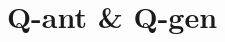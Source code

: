 %
%
%
% 
%
%
\title{ \huge \bfseries Q-ant \& Q-gen}

\documentclass[10pt]{article}
\usepackage[english]{babel}
\usepackage[utf8x]{inputenc}
\usepackage{amsmath}
\usepackage{graphicx}
\usepackage[colorinlistoftodos]{todonotes}
\usepackage{hyperref}
\usepackage{booktabs,array}
\usepackage{tabto}



